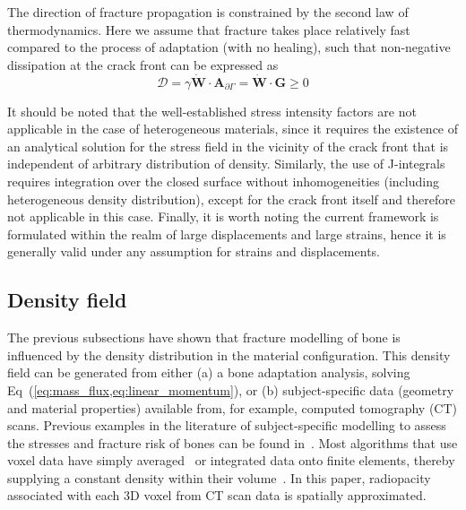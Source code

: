 \documentclass[review]{elsarticle}
\numberwithin{equation}{section}
\begin{document}
The direction of fracture propagation is
constrained by the second law of thermodynamics. Here we assume that fracture takes place
relatively fast compared to the process of adaptation (with no healing), 
such that non-negative dissipation at the crack front can be expressed as
\begin{equation}
	\mathcal{D} = \gamma \dot{\mathbf{W}} \cdot \mathbf{A}_{\partial\Gamma}= \dot{\mathbf{W}} \cdot \mathbf{G}\ge0
\end{equation}

It should be noted that the well-established stress intensity factors are not applicable 
in the case of heterogeneous materials, since it requires the existence of
an analytical solution for the stress field in the vicinity of the crack front that is
independent of arbitrary distribution of density. 
Similarly, the use of
J-integrals requires integration over the closed surface without
inhomogeneities (including heterogeneous density distribution), except for the crack front itself and therefore not applicable in this case.
Finally, it is worth noting the current framework is formulated within 
the realm of large displacements and large strains, hence it 
is generally valid under any assumption for strains and displacements.




\subsection{Density field}
\label{sec:dens_mapping}
The previous subsections have shown that  fracture modelling of bone is influenced by the density distribution in the material configuration. This density field can be generated from either (a) a bone adaptation analysis, solving Eq~(\ref{eq:mass_flux,eq:linear_momentum}), or (b) subject-specific data (geometry and material properties) available from, for example, computed tomography (CT) scans. Previous examples in the literature of subject-specific modelling to assess the stresses and fracture risk of bones can be found in~\citep{poelert2013patient,Helgason2008b,Yosibash2010}. Most algorithms that use voxel data have simply averaged~\citep{zannoni1999material} or integrated data onto finite elements, thereby supplying a constant density within their volume~\citep{taddei2007material, schileo2008subject}. In this paper, radiopacity associated with each 3D voxel from CT scan data is spatially approximated. 
\end{document}
